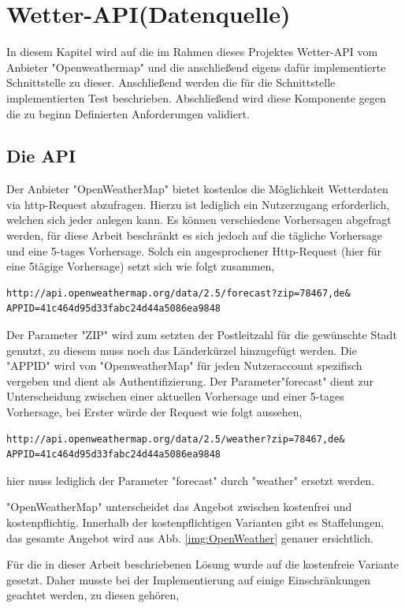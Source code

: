 \section{Wetter-API(Datenquelle)}
In diesem Kapitel wird auf die im Rahmen dieses Projektes Wetter-API vom Anbieter "Openweathermap" und die anschließend eigens dafür implementierte Schnittstelle zu dieser. Anschließend werden die für die Schnittstelle  implementierten Test beschrieben. Abschließend wird diese Komponente gegen die zu beginn Definierten Anforderungen validiert. 
\subsection{Die API}
Der Anbieter "OpenWeatherMap" bietet kostenlos die Möglichkeit Wetterdaten via http-Request abzufragen. 
Hierzu ist lediglich ein Nutzerzugang erforderlich, welchen sich jeder anlegen kann. Es können verschiedene Vorhersagen abgefragt werden, für diese Arbeit beschränkt es sich jedoch auf die tägliche Vorhersage und eine  5-tages Vorhersage. Solch ein angesprochener Http-Request (hier für eine 5tägige Vorhersage) setzt sich wie folgt zusammen, 
\begin{lstlisting}
http://api.openweathermap.org/data/2.5/forecast?zip=78467,de&
APPID=41c464d95d33fabc24d44a5086ea9848
\end{lstlisting}

Der Parameter "ZIP" wird zum setzten der Postleitzahl für die gewünschte Stadt genutzt, zu diesem muss noch das Länderkürzel hinzugefügt werden. Die "APPID" wird von "OpenweatherMap" für jeden Nutzeraccount spezifisch vergeben und dient als Authentifizierung. Der Parameter"forecast" dient zur Unterscheidung zwischen einer aktuellen Vorhersage und einer 5-tages Vorhersage, bei Erster würde der Request wie folgt aussehen, 

\begin{lstlisting}
http://api.openweathermap.org/data/2.5/weather?zip=78467,de&
APPID=41c464d95d33fabc24d44a5086ea9848
\end{lstlisting}

hier muss lediglich der Parameter "forecast" durch "weather" ersetzt werden. 

"OpenWeatherMap" unterscheidet das Angebot zwischen kostenfrei und kostenpflichtig. Innerhalb der kostenpflichtigen Varianten gibt es Staffelungen, das gesamte Angebot wird aus Abb. \ref{img:OpenWeather} genauer ersichtlich. 

Für die in dieser Arbeit beschriebenen Lösung wurde auf die kostenfreie Variante gesetzt. Daher musste bei der Implementierung auf einige Einschränkungen geachtet werden, zu diesen gehören, 

